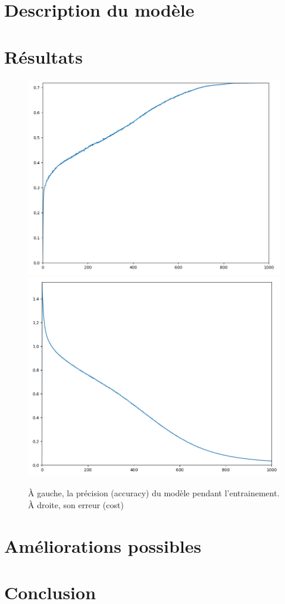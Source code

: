 \documentclass{article}
\begin{document}
\section*{Description du modèle}



\section*{Résultats}


\begin{figure}[h]
  \includegraphics[scale=0.264]{assets/acc}
  \includegraphics[scale=0.265]{assets/loss}
  
  \caption{À gauche, la précision (accuracy) du modèle pendant l'entrainement. À droite, son erreur (cost)}
  \label{acc_los}
\end{figure}

\section*{Améliorations possibles}

\section*{Conclusion}
\end{document}
